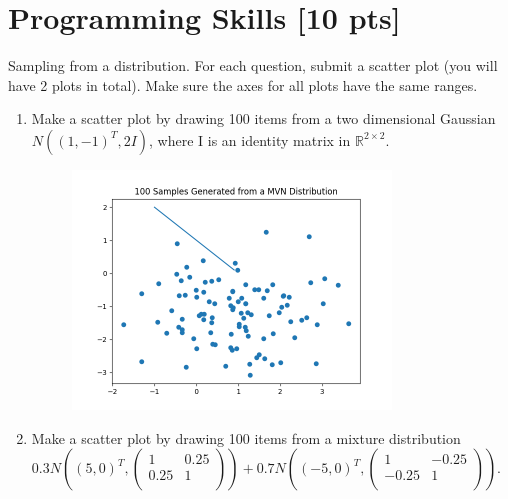 \documentclass[a4paper]{article}
\theoremstyle{definition}
\newenvironment{soln}{
	\leavevmode\color{blue}\ignorespaces
}{}
\begin{document}
	\section{Programming Skills [10 pts]}
	Sampling from a distribution.  For each question, submit a scatter plot (you will have 2 plots in total).  Make sure the axes for all plots have the same ranges.
	\begin{enumerate}
		\item Make a scatter plot by drawing 100 items from a two dimensional Gaussian $N((1, -1)^{T}, 2I)$, where I is an identity matrix in $\mathbb{R}^{2 \times 2}$.
		
			\begin{soln}
			\begin{figure}[h!]
			    \centering
			    \includegraphics[width=0.8\textwidth]{plots/mvn_samples.png}  
			    \captionsetup{labelformat=empty}
			    \caption{}
			    \label{fig:mvn_samples}
			\end{figure}
		\end{soln}
	
		\item Make a scatter plot by drawing 100 items from a mixture distribution 
		$0.3 N\left((5, 0)^{T}, \begin{pmatrix} 1 & 0.25 \\ 0.25 & 1\\ \end{pmatrix}\right)
		+0.7 N\left((-5, 0)^{T}, \begin{pmatrix} 1 & -0.25 \\ -0.25 & 1\\ \end{pmatrix}\right)
		$.
		

\end{enumerate}
\end{document}
